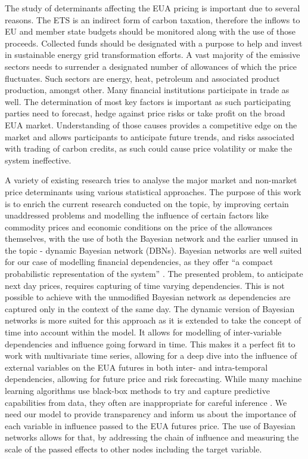 \documentclass[12pt, letterpaper]{article}
\begin{document}
The study of determinants affecting the EUA pricing is important due to several reasons. The ETS is an indirect form of carbon taxation, therefore the inflows to EU and member state budgets should be monitored along with the use of those proceeds. Collected funds should be designated with a purpose to help and invest in sustainable energy grid transformation efforts. A vast majority of the emissive sectors needs to surrender a designated number of allowances of which the price fluctuates. Such sectors are energy, heat, petroleum and associated product production, amongst other. Many financial institutions participate in trade as well. The determination of most key factors is important as such participating parties need to forecast, hedge against price risks or take profit on the broad EUA market. Understanding of those causes provides a competitive edge on the market and allows participants to anticipate future trends, and risks associated with trading of carbon credits, as such could cause price volatility or make the system ineffective.

A variety of existing research tries to analyse the major market and non-market price determinants using various statistical approaches. The purpose of this work is to enrich the current research conducted on the topic, by improving certain unaddressed problems and modelling the influence of certain factors like commodity prices and economic conditions on the price of the allowances themselves, with the use of both the Bayesian network and the earlier unused in the topic - dynamic Bayesian network (DBNs). Bayesian networks are well suited for our case of modelling financial dependencies, as they offer “a compact probabilistic representation of the system” \parencite{kitson2023}. The presented problem, to anticipate next day prices, requires capturing of time varying dependencies. This is not possible to achieve with the unmodified Bayesian network as dependencies are captured only in the context of the same day. The dynamic version of Bayesian networks is more suited for this approach as it is extended to take the concept of time into account within the model. It allows for modelling of inter-variable dependencies and influence going forward in time. This makes it a perfect fit to work with multivariate time series, allowing for a deep dive into the influence of external variables on the EUA futures in both inter- and intra-temporal dependencies, allowing for future price and risk forecasting. While many machine learning algorithms use black-box methods to try and capture predictive capabilities from data, they often are inappropriate for careful inference \parencite{kitson2023}.  We need our model to provide transparency and inform us about the importance of each variable in influence passed to the EUA futures price. The use of Bayesian networks allows for that, by addressing the chain of influence and measuring the scale of the passed effects to other nodes including the target variable. 
\end{document}
